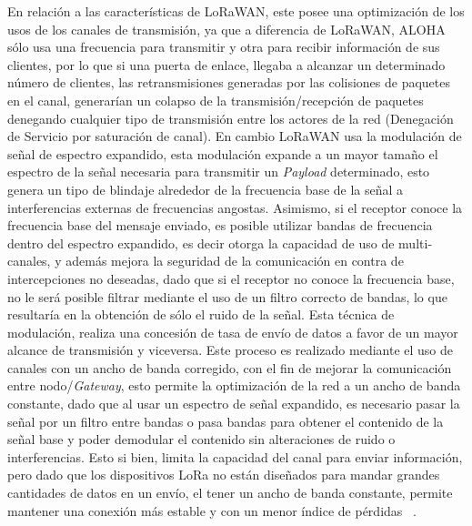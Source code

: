 \begin{justify}
 En relación a las características de LoRaWAN, este posee una optimización de los usos de los canales de transmisión, ya que a diferencia de LoRaWAN, ALOHA sólo usa una frecuencia para transmitir y otra para recibir información de sus clientes, por lo que si una puerta de enlace, llegaba a alcanzar un determinado número de clientes, las retransmisiones generadas por las colisiones de paquetes en el canal, generarían un colapso de la transmisión/recepción de paquetes denegando cualquier tipo de transmisión entre los actores de la red (Denegación de Servicio por saturación de canal). En cambio LoRaWAN usa la modulación de señal de espectro expandido, esta modulación expande a un mayor tamaño el espectro de la señal necesaria para transmitir un \textit{Payload} determinado, esto genera un tipo de blindaje alrededor de la frecuencia base de la señal a interferencias externas de frecuencias angostas. Asimismo, si el receptor conoce la frecuencia base del mensaje enviado, es posible utilizar bandas de frecuencia dentro del espectro expandido, es decir otorga la capacidad de uso de multi-canales, y además mejora la seguridad de la comunicación en contra de intercepciones no deseadas, dado que si el receptor no conoce la frecuencia base, no le será posible filtrar mediante el uso de un filtro correcto de bandas, lo que resultaría en la obtención de sólo el ruido de la señal. Esta técnica de modulación, realiza una concesión de tasa de envío de datos a favor de un mayor alcance de transmisión y viceversa. Este proceso es realizado mediante el uso de canales con un ancho de banda corregido, con el fin de mejorar la comunicación entre nodo/\textit{Gateway}, esto permite la optimización de la red a un ancho de banda constante, dado que al usar un espectro de señal expandido, es necesario pasar la señal por un filtro entre bandas o pasa bandas para obtener el contenido de la señal base y poder demodular el contenido sin alteraciones de ruido o interferencias. Esto si bien, limita la capacidad del canal para enviar información, pero dado que los dispositivos LoRa no están diseñados para mandar grandes cantidades de datos en un envío, el tener un ancho de banda constante, permite mantener una conexión más estable y con un menor índice de pérdidas ~\cite{modulation}.


\end{justify}
